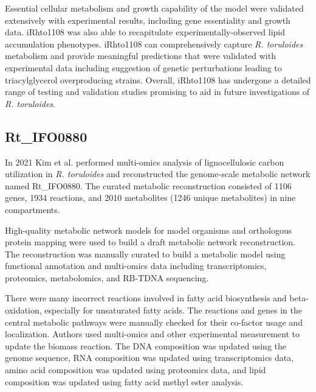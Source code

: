 

Essential cellular metabolism and growth
capability of the model were validated extensively with experimental
results, including gene essentiality \cite{Coradetti2018} and growth
data. iRhto1108 was also able to recapitulate experimentally-observed
lipid accumulation phenotypes. iRhto1108 can comprehensively capture \textit{R. toruloides} metabolism and provide meaningful predictions that
were validated with experimental data including suggestion of genetic
perturbations leading to triacylglycerol overproducing strains. Overall, iRhto1108 has undergone a
detailed range of testing and validation studies promising to aid in future
investigations of \textit{R. toruloides}. \cite{Dinh2019}


\subsection{Rt\_IFO0880}

In 2021 Kim et al. performed multi-omics analysis of lignocellulosic carbon utilization in \textit{R. toruloides} and reconstructed
the genome-scale metabolic network named Rt\_IFO0880. The
curated metabolic reconstruction consisted of 1106 genes, 1934
reactions, and 2010 metabolites (1246 unique metabolites) in
nine compartments. \cite{Kim2021}

High-quality metabolic network
models for model organisms and orthologous protein mapping were used to build a
draft metabolic network reconstruction. The reconstruction was manually curated to
build a metabolic model using functional annotation and multi-omics data including
transcriptomics, proteomics, metabolomics, and RB-TDNA sequencing. \cite{Kim2021}

There were many incorrect reactions involved in fatty acid
biosynthesis and beta-oxidation, especially for unsaturated fatty
acids. The reactions and genes in the central metabolic pathways
were manually checked for their co-factor usage and localization. Authors used multi-omics and other experimental measurement
to update the biomass reaction. The DNA composition was
updated using the genome sequence, RNA composition was
updated using transcriptomics data, amino acid composition
was updated using proteomics data, and lipid composition
was updated using fatty acid methyl ester analysis. \cite{Kim2021}
 
